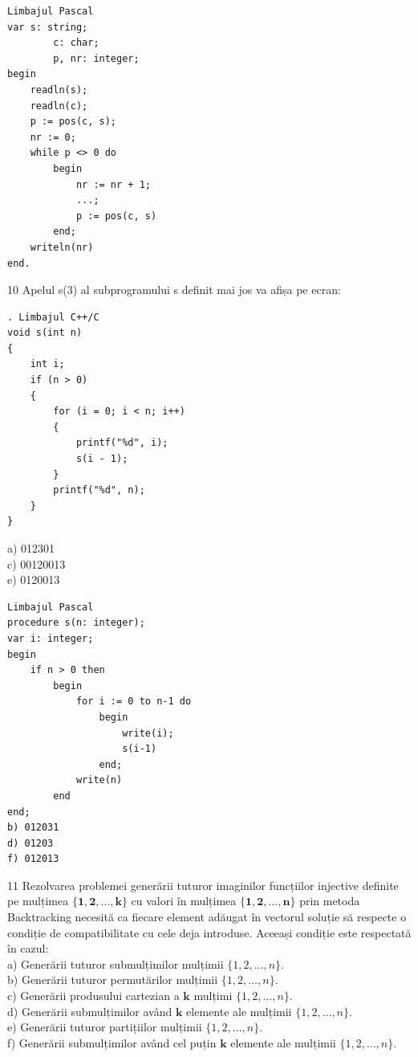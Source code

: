 \documentclass[10pt]{article}
\begin{document}
\begin{verbatim}
Limbajul Pascal
var s: string;
        c: char;
        p, nr: integer;
begin
    readln(s);
    readln(c);
    p := pos(c, s);
    nr := 0;
    while p <> 0 do
        begin
            nr := nr + 1;
            ...;
            p := pos(c, s)
        end;
    writeln(nr)
end.
\end{verbatim}

10 Apelul s(3) al subprogramului s definit mai jos va afișa pe ecran:

\begin{verbatim}
. Limbajul C++/C
void s(int n)
{
    int i;
    if (n > 0)
    {
        for (i = 0; i < n; i++)
        {
            printf("%d", i);
            s(i - 1);
        }
        printf("%d", n);
    }
}
\end{verbatim}

a) 012301\\
c) 00120013\\
e) 0120013

\begin{verbatim}
Limbajul Pascal
procedure s(n: integer);
var i: integer;
begin
    if n > 0 then
        begin
            for i := 0 to n-1 do
                begin
                    write(i);
                    s(i-1)
                end;
            write(n)
        end
end;
b) 012031
d) 01203
f) 012013
\end{verbatim}

11 Rezolvarea problemei generării tuturor imaginilor funcțiilor injective definite pe mulțimea $\{\mathbf{1}, \mathbf{2}, \ldots, \mathbf{k}\}$ cu valori în mulțimea $\{\mathbf{1}, \mathbf{2}, \ldots, \mathbf{n}\}$ prin metoda Backtracking necesită ca fiecare element adăugat în vectorul soluție să respecte o condiție de compatibilitate cu cele deja introduse. Aceeași condiție este respectată în cazul:\\
a) Generării tuturor submulțimilor mulțimii $\{1,2, \ldots, n\}$.\\
b) Generării tuturor permutărilor mulțimii $\{1,2, \ldots, n\}$.\\
c) Generării produsului cartezian a $\mathbf{k}$ mulțimi $\{1,2, \ldots, n\}$.\\
d) Generării submulțimilor având $\mathbf{k}$ elemente ale mulțimii $\{1,2, \ldots, n\}$.\\
e) Generării tuturor partițiilor mulțimii $\{1,2, \ldots, n\}$.\\
f) Generării submulțimilor având cel puțin $\mathbf{k}$ elemente ale mulțimii $\{1,2, \ldots, n\}$.
\end{document}
